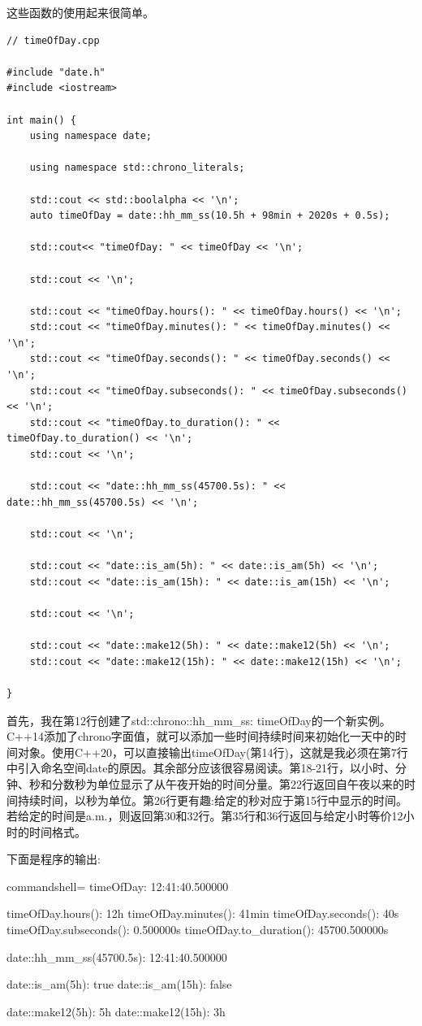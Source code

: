 这些函数的使用起来很简单。

\begin{lstlisting}[style=styleCXX]
// timeOfDay.cpp

#include "date.h"
#include <iostream>

int main() {
	using namespace date;    
	
	using namespace std::chrono_literals;
	
	std::cout << std::boolalpha << '\n';
	auto timeOfDay = date::hh_mm_ss(10.5h + 98min + 2020s + 0.5s);
	
	std::cout<< "timeOfDay: " << timeOfDay << '\n';
	
	std::cout << '\n';
	
	std::cout << "timeOfDay.hours(): " << timeOfDay.hours() << '\n';
	std::cout << "timeOfDay.minutes(): " << timeOfDay.minutes() << '\n';
	std::cout << "timeOfDay.seconds(): " << timeOfDay.seconds() << '\n';
	std::cout << "timeOfDay.subseconds(): " << timeOfDay.subseconds() << '\n';
	std::cout << "timeOfDay.to_duration(): " << timeOfDay.to_duration() << '\n';
	std::cout << '\n';
	
	std::cout << "date::hh_mm_ss(45700.5s): " << date::hh_mm_ss(45700.5s) << '\n';
	
	std::cout << '\n';
	
	std::cout << "date::is_am(5h): " << date::is_am(5h) << '\n';
	std::cout << "date::is_am(15h): " << date::is_am(15h) << '\n';
	
	std::cout << '\n';
	
	std::cout << "date::make12(5h): " << date::make12(5h) << '\n';
	std::cout << "date::make12(15h): " << date::make12(15h) << '\n';

}
\end{lstlisting}

首先，我在第12行创建了std::chrono::hh\_mm\_ss: timeOfDay的一个新实例。C++14添加了chrono字面值，就可以添加一些时间持续时间来初始化一天中的时间对象。使用C++20，可以直接输出timeOfDay(第14行)，这就是我必须在第7行中引入命名空间date的原因。其余部分应该很容易阅读。第18-21行，以小时、分钟、秒和分数秒为单位显示了从午夜开始的时间分量。第22行返回自午夜以来的时间持续时间，以秒为单位。第26行更有趣:给定的秒对应于第15行中显示的时间。若给定的时间是a.m.，则返回第30和32行。第35行和36行返回与给定小时等价12小时的时间格式。

下面是程序的输出:

\begin{tcblisting}{commandshell={}}
timeOfDay: 12:41:40.500000

timeOfDay.hours(): 12h
timeOfDay.minutes(): 41min
timeOfDay.seconds(): 40s
timeOfDay.subseconds(): 0.500000s
timeOfDay.to_duration(): 45700.500000s

date::hh_mm_ss(45700.5s): 12:41:40.500000

date::is_am(5h): true
date::is_am(15h): false

date::make12(5h): 5h
date::make12(15h): 3h
\end{tcblisting}

